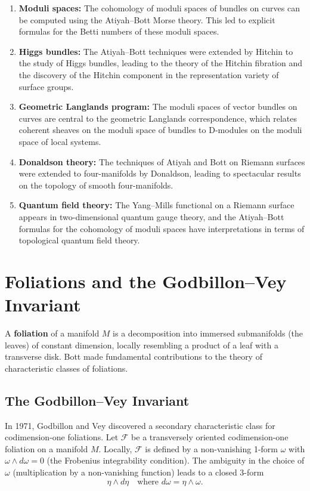 \begin{enumerate}
\item \textbf{Moduli spaces:} The cohomology of moduli spaces of bundles on curves can be computed using the Atiyah--Bott Morse theory. This led to explicit formulas for the Betti numbers of these moduli spaces.

\item \textbf{Higgs bundles:} The Atiyah--Bott techniques were extended by Hitchin to the study of Higgs bundles, leading to the theory of the Hitchin fibration and the discovery of the Hitchin component in the representation variety of surface groups.

\item \textbf{Geometric Langlands program:} The moduli spaces of vector bundles on curves are central to the geometric Langlands correspondence, which relates coherent sheaves on the moduli space of bundles to D-modules on the moduli space of local systems.

\item \textbf{Donaldson theory:} The techniques of Atiyah and Bott on Riemann surfaces were extended to four-manifolds by Donaldson, leading to spectacular results on the topology of smooth four-manifolds.

\item \textbf{Quantum field theory:} The Yang--Mills functional on a Riemann surface appears in two-dimensional quantum gauge theory, and the Atiyah--Bott formulas for the cohomology of moduli spaces have interpretations in terms of topological quantum field theory.
\end{enumerate}

\section{Foliations and the Godbillon--Vey Invariant}

A \textbf{foliation} of a manifold \(M\) is a decomposition into immersed submanifolds (the leaves) of constant dimension, locally resembling a product of a leaf with a transverse disk. Bott made fundamental contributions to the theory of characteristic classes of foliations.

\subsection{The Godbillon--Vey Invariant}

In 1971, Godbillon and Vey discovered a secondary characteristic class for codimension-one foliations. Let \(\mathcal{F}\) be a transversely oriented codimension-one foliation on a manifold \(M\). Locally, \(\mathcal{F}\) is defined by a non-vanishing 1-form \(\omega\) with \(\omega \wedge d\omega = 0\) (the Frobenius integrability condition). The ambiguity in the choice of \(\omega\) (multiplication by a non-vanishing function) leads to a closed 3-form
\[
\eta \wedge d\eta \quad \text{where } d\omega = \eta \wedge \omega.
\]

